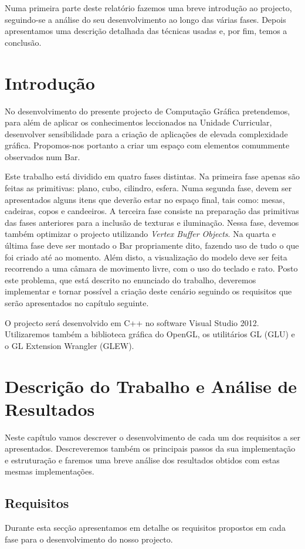 \documentclass[a5paper,onecolumn, 11pt]{article}
\begin{document}
Numa primeira parte deste relatório fazemos uma breve introdução ao projecto, seguindo-se a análise do seu desenvolvimento ao longo das várias fases. Depois apresentamos uma descrição detalhada das técnicas usadas e, por fim, temos a conclusão.


\clearpage
\section{Introdução}
No desenvolvimento do presente projecto de Computação Gráfica pretendemos, para além de aplicar os conhecimentos leccionados na Unidade Curricular, desenvolver sensibilidade para a criação de aplicações de elevada complexidade gráfica. Propomos-nos portanto a criar um espaço com elementos comummente observados num Bar.

Este trabalho está dividido em quatro fases distintas. Na primeira fase apenas são feitas as primitivas: plano, cubo, cilindro, esfera. Numa segunda fase, devem ser apresentados alguns itens que deverão estar no espaço final, tais como: mesas, cadeiras, copos e candeeiros. A terceira fase consiste na preparação das primitivas das fases anteriores para a inclusão de texturas e iluminação. Nessa fase, devemos também optimizar o projecto utilizando \textit{Vertex Buffer Objects}. Na quarta e última fase deve ser montado o Bar propriamente dito, fazendo uso de tudo o que foi criado até ao momento. Além disto, a visualização do modelo deve ser feita recorrendo a uma câmara de movimento livre, com o uso do teclado e rato. Posto este problema, que está descrito no enunciado do trabalho, deveremos implementar e tornar possível a criação deste cenário seguindo os requisitos que serão apresentados no capítulo seguinte.

O projecto será desenvolvido em C++ no software Visual Studio 2012. Utilizaremos também a biblioteca gráfica do OpenGL, os utilitários GL (GLU) e o GL Extension Wrangler (GLEW).


\clearpage
\newpage
\section{Descrição do Trabalho e Análise de Resultados}
Neste capítulo vamos descrever o desenvolvimento de cada um dos requisitos a ser apresentados. Descreveremos também os principais passos da sua implementação e estruturação e faremos uma breve análise dos resultados obtidos com estas mesmas implementações.


\newpage
\onecolumn
\subsection{Requisitos}
Durante esta secção apresentamos em detalhe os requisitos propostos em cada fase para o desenvolvimento do nosso projecto.
\end{document}
